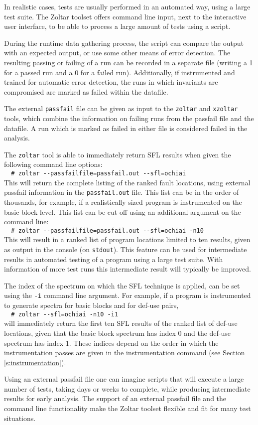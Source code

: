 
In realistic cases, tests are usually performed in an automated way,
using a large test suite.
The Zoltar toolset offers command line input, 
next to the interactive user interface, 
to be able to process a large amount of tests using a script.

During the runtime data gathering process, 
the script can compare the output with an expected output,
or use some other means of error detection.
The resulting passing or failing of a run
can be recorded in a separate file 
(writing a 1 for a passed run and a 0 for a failed run).
Additionally, if instrumented and trained for 
automatic error detection,
the runs in which invariants are compromised
are marked as failed within the datafile.

The external \verb|passfail| file can be given as input
to the \verb|zoltar| and \verb|xzoltar| tools,
which combine the information on failing runs from
the passfail file and the datafile.
A run which is marked as failed in either file is
considered failed in the analysis.

The \verb|zoltar| tool is able to immediately return 
SFL results when given the following command line options:\\
\verb|  # zoltar --passfailfile=passfail.out --sfl=ochiai|\\
This will return the complete listing of the ranked 
fault locations, using external passfail information in
the \verb|passfail.out| file.
This list can be in the order of thousands, 
for example, if a realistically sized program
is instrumented on the basic block level.
This list can be cut off using an additional argument
on the command line:\\
\verb|  # zoltar --passfailfile=passfail.out --sfl=ochiai -n10|\\
This will result in a ranked list of program locations
limited to ten results, given as output in the console (on \verb|stdout|).
This feature can be used for intermediate results in 
automated testing of a program using a large test suite.
With information of more test runs this intermediate result
will typically be improved.

The index of the spectrum on which the SFL technique is applied,
can be set using the \verb|-i| command line argument.
For example, if a program is instrumented to generate 
spectra for basic blocks and for def-use pairs,\\
\verb|  # zoltar --sfl=ochiai -n10 -i1|\\
will immediately return the first ten SFL results
of the ranked list of def-use locations,
given that the basic block spectrum has index 0
and the def-use spectrum has index 1.
These indices depend on the order in which the instrumentation passes
are given in the instrumentation command (see Section \ref{s:instrumentation}).

Using an external passfail file one can imagine scripts that
will execute a large number of tests, taking days or weeks to complete, 
while producing intermediate results for early analysis.
The support of an external passfail file and the command line functionality 
make the Zoltar toolset flexible and fit for many test situations.